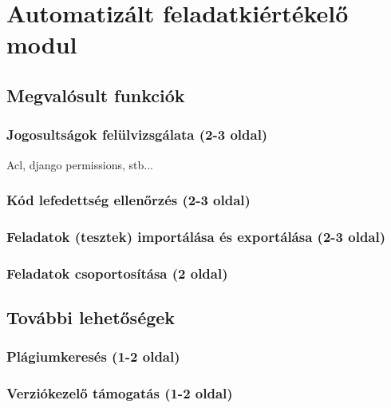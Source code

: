 \chapter{Automatizált feladatkiértékelő modul}\label{chapter:exercise}

\section{Megvalósult funkciók}
\subsection{Jogosultságok felülvizsgálata (2-3 oldal)}
Acl, django permissions, stb...

\subsection{Kód lefedettség ellenőrzés (2-3 oldal)}

\subsection{Feladatok (tesztek) importálása és exportálása (2-3 oldal)}

\subsection{Feladatok csoportosítása (2 oldal)}

\section{További lehetőségek}

\subsection{Plágiumkeresés (1-2 oldal)}

\subsection{Verziókezelő támogatás (1-2 oldal)}